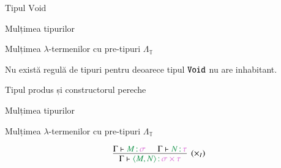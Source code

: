 \documentclass[xcolor=pdftex,romanian,colorlinks]{beamer}
\begin{document}
\begin{frame}{Tipul $\mathrm{Void}$}

Mulțimea  \alert{tipurilor}  
\begin{center}
 \end{center}

\vspace{.3cm}
Mulțimea \alert{$\lambda$-termenilor cu pre-tipuri $\Lambda_\mathbb{T}$} 
\begin{center}
\end{center}

Nu există regulă de tipuri pentru deoarece tipul \alert{$\texttt{Void}$} nu are inhabitant.


\end{frame}

\begin{frame}{Tipul produs și constructorul pereche}

Mulțimea  \alert{tipurilor}  
\begin{center}
 \end{center}

\vspace{.3cm}
Mulțimea \alert{$\lambda$-termenilor cu pre-tipuri $\Lambda_\mathbb{T}$} 
\begin{center}
\end{center}

\[
\infer[(\times_I)]
	{\Gamma \vdash \type{\PairL{M}{N}}{\ProductT{\sigma}{\tau}}}
	{\Gamma \vdash \type{M}{\sigma} \hspace{.5cm} \Gamma \vdash \type{N}{\tau}}
\]

\end{frame}
\end{document}
